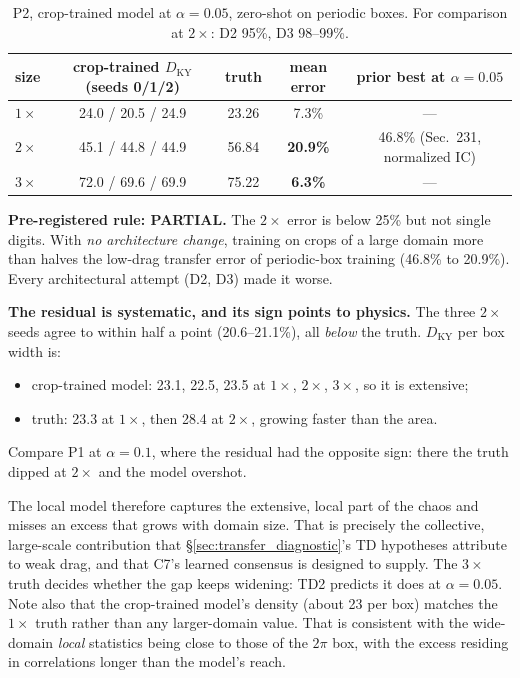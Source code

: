 \documentclass[11pt]{article}
\begin{document}
\begin{table}[h]
\centering
\small
\begin{tabular}{lcccc}
\toprule
size & crop-trained $D_{\mathrm{KY}}$ (seeds 0/1/2) & truth & mean error & prior best at $\alpha{=}0.05$ \\
\midrule
$1\times$ & 24.0 / 20.5 / 24.9 & 23.26 & 7.3\% & --- \\
$2\times$ & 45.1 / 44.8 / 44.9 & 56.84 & \textbf{20.9\%} & 46.8\% (Sec.\ 231, normalized IC) \\
$3\times$ & 72.0 / 69.6 / 69.9 & 75.22 & \textbf{6.3\%} & --- \\
\bottomrule
\end{tabular}
\caption{P2, crop-trained model at $\alpha{=}0.05$, zero-shot on periodic
boxes. For comparison at $2\times$: D2 95\%, D3 98--99\%.}
\label{tab:p2}
\end{table}

\textbf{Pre-registered rule: PARTIAL.} The $2\times$ error is below 25\%
but not single digits. With \emph{no architecture change}, training on
crops of a large domain more than halves the low-drag transfer error of
periodic-box training (46.8\% to 20.9\%). Every architectural attempt
(D2, D3) made it worse.

\textbf{The residual is systematic, and its sign points to physics.} The
three $2\times$ seeds agree to within half a point (20.6--21.1\%), all
\emph{below} the truth. $D_{\mathrm{KY}}$ per box width is:
\begin{itemize}[leftmargin=*]
\item crop-trained model: 23.1, 22.5, 23.5 at $1\times$, $2\times$,
  $3\times$, so it is extensive;
\item truth: 23.3 at $1\times$, then 28.4 at $2\times$, growing faster
  than the area.
\end{itemize}
Compare P1 at $\alpha{=}0.1$, where the residual had the opposite sign:
there the truth dipped at $2\times$ and the model overshot.

The local model therefore captures the extensive, local part of the chaos
and misses an excess that grows with domain size. That is precisely the
collective, large-scale contribution that
\S\ref{sec:transfer_diagnostic}'s TD hypotheses attribute to weak drag,
and that C7's learned consensus is designed to supply. The $3\times$
truth decides whether the gap keeps widening: TD2 predicts it does at
$\alpha{=}0.05$. Note also that the crop-trained model's density (about
23 per box) matches the $1\times$ truth rather than any larger-domain
value. That is consistent with the wide-domain \emph{local} statistics
being close to those of the $2\pi$ box, with the excess residing in
correlations longer than the model's reach.
\end{document}
